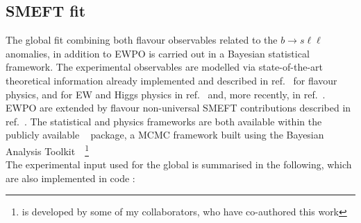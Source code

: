\subsection{SMEFT fit}
\label{sec:strategy}
The global fit combining both flavour observables related to the $ b \to s \ell \ell$ anomalies, in addition to EWPO is carried out in a Bayesian statistical framework. The experimental observables are modelled via state-of-the-art theoretical information already implemented and described in ref.~\cite{Ciuchini:2019usw} for flavour physics, and for EW and Higgs physics in ref.~\cite{Ciuchini:2013pca} and, more recently, in ref.~\cite{deBlas:2016ojx}. EWPO are extended by flavour non-universal  SMEFT contributions described in ref.~\cite{Efrati:2015eaa,deBlas:2019wgy}. The statistical and physics frameworks are both available within the publicly available \HEPfit~\cite{deBlas:2019okz} package,  a MCMC framework built using the Bayesian Analysis Toolkit~\cite{2009CoPhC.180.2197C}~\footnote{ \HEPfit is developed by some of my collaborators, who have co-authored this work}\\
The experimental input used for the global is summarised in the following, which are also implemented in \HEPfit code : 

